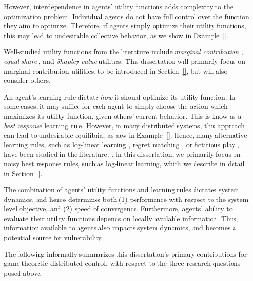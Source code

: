 However, interdependence in agents' utility functions adds complexity to the optimization problem. Individual agents do not have full control over the function they aim to optimize. Therefore, if agents simply optimize their utility functions, this may lead to undesirable collective behavior, as we show in Example~\ref{}. 

Well-studied utility functions from the literature include {\it marginal contribution} \cite{wolpert}, {\it equal share} \cite{marden paper}, and {\it Shapley value} \cite{shapley paper} utilities. This dissertation will primarily focus on marginal contribution utilities, to be introduced in Section~\ref{}, but will also consider others. 



An agent's learning rule dictate {\it how} it should optimize its utility function. In some cases, it may suffice for each agent to simply choose the action which maximizes its utility function, given others' current behavior. This is know as a {\it best response} learning rule. However, in many distributed systems, this approach can lead to undesirable equilibria, as saw in Example~\ref{}. Hence, many alternative learning rules, such as log-linear learning \cite{Blume1993}, regret matching \cite{blah}, or fictitious play \cite{blah}, have been studied in the literature. . In this dissertation, we primarily focus on noisy best response rules, such as log-linear learning, which we describe in detail in Section~\ref{}.

The combination of agents' utility functions and learning rules dictates system dynamics, and hence determines both (1) performance with respect to the system level objective, and (2) speed of convergence. Furthermore, agents' ability to evaluate their utility functions depends on locally available information. Thus, information available to agents also impacts system dynamics, and becomes a potential source for vulnerability.




The following informally summarizes this dissertation's primary contributions for game theoretic distributed control, with respect to the three research questions posed above.

